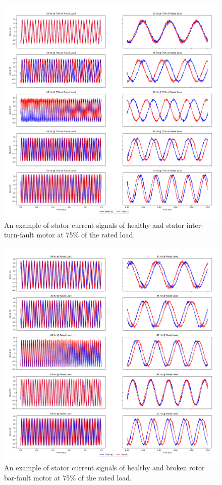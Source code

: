 \pagebreak
\begin{figure}[p]
	\centering
	\includegraphics[width=0.75\paperwidth,keepaspectratio=true]{./fig/stator_75.png}
	\caption{An example of stator current signals of healthy and stator inter-turn-fault motor at 75$\%$ of the rated load.}	
	\label{stator75}
\end{figure}
\pagebreak
\begin{figure}[p]
	\centering
	\includegraphics[width=0.75\paperwidth,keepaspectratio=true]{./fig/rotor_100.png}
	\caption{An example of stator current signals of healthy and broken rotor bar-fault motor at 75$\%$ of the rated load.}	
	\label{rotor100}
\end{figure}
